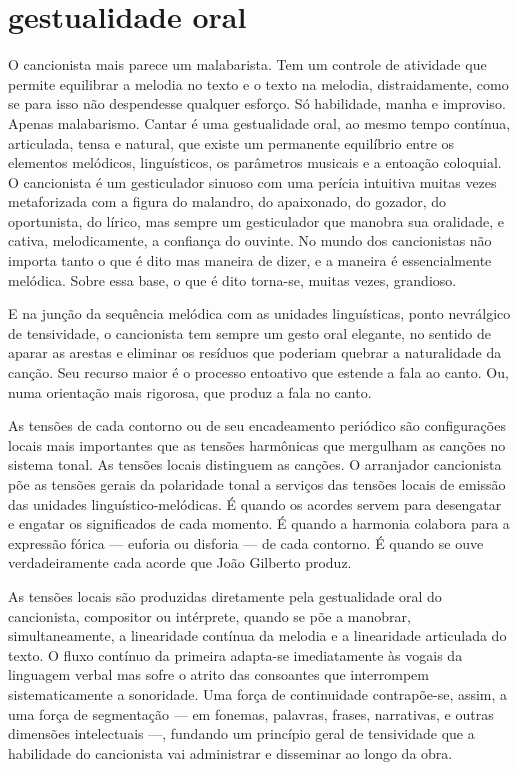 \section{gestualidade oral}

O cancionista mais parece um malabarista. Tem um controle de atividade
que permite equilibrar a melodia no texto e o texto na melodia,
distraidamente, como se para isso não despendesse qualquer esforço. Só
habilidade, manha e improviso. Apenas malabarismo. Cantar é uma
gestualidade oral, ao mesmo tempo contínua, articulada, tensa e natural,
que existe um permanente equilíbrio entre os elementos melódicos,
linguísticos, os parâmetros musicais e a entoação coloquial. O
cancionista é um gesticulador sinuoso com uma perícia intuitiva muitas
vezes metaforizada com a figura do malandro, do apaixonado, do gozador,
do oportunista, do lírico, mas sempre um gesticulador que manobra sua
oralidade, e cativa, melodicamente, a confiança do ouvinte. No mundo dos
cancionistas não importa tanto o que é dito mas maneira de dizer, e a
maneira é essencialmente melódica. Sobre essa base, o que é dito
torna-se, muitas vezes, grandioso.

E na junção da sequência melódica com as unidades linguísticas, ponto
nevrálgico de tensividade, o cancionista tem sempre um gesto oral
elegante, no sentido de aparar as arestas e eliminar os resíduos que
poderiam quebrar a naturalidade da canção. Seu recurso maior é o
processo entoativo que estende a fala ao canto. Ou, numa orientação mais
rigorosa, que produz a fala no canto.

As tensões de cada contorno ou de seu encadeamento periódico são
configurações locais mais importantes que as tensões harmônicas que
mergulham as canções no sistema tonal. As tensões locais distinguem as
canções. O arranjador cancionista põe as tensões gerais da polaridade
tonal a serviços das tensões locais de emissão das unidades
linguístico-melódicas. É quando os acordes servem para desengatar e
engatar os significados de cada momento. É quando a harmonia colabora
para a expressão fórica --- euforia ou disforia --- de cada contorno. É quando
se ouve verdadeiramente cada acorde que João Gilberto produz.

As tensões locais são produzidas diretamente pela gestualidade oral do
cancionista, compositor ou intérprete, quando se põe a manobrar,
simultaneamente, a linearidade contínua da melodia e a linearidade
articulada do texto. O fluxo contínuo da primeira adapta-se
imediatamente às vogais da linguagem verbal mas sofre o atrito das
consoantes que interrompem sistematicamente a sonoridade. Uma força de
continuidade contrapõe-se, assim, a uma força de segmentação --- em
fonemas, palavras, frases, narrativas, e outras dimensões intelectuais ---,
fundando um princípio geral de tensividade que a habilidade do
cancionista vai administrar e disseminar ao longo da obra.

